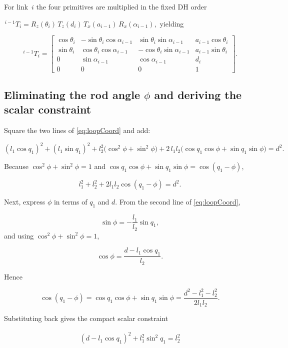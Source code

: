 \documentclass[12pt,a4paper]{article}
\begin{document}
For link~$i$ the four primitives are multiplied in the fixed DH order 
 
\(
{}^{\,i-1}\!T_i = R_{z}(\theta_i)\,T_{z}(d_i)\,T_{x}(a_{i-1})\,R_{x}(\alpha_{i-1}),
\)
yielding

\[
{}^{\,i-1}\!T_i =
\begin{bmatrix}
\cos\theta_i & -\sin\theta_i\cos\alpha_{i-1} &  \sin\theta_i\sin\alpha_{i-1} & a_{i-1}\cos\theta_i\\
\sin\theta_i &  \cos\theta_i\cos\alpha_{i-1} & -\cos\theta_i\sin\alpha_{i-1} & a_{i-1}\sin\theta_i\\
0            &  \sin\alpha_{i-1}             &  \cos\alpha_{i-1}             & d_i\\
0&0&0&1
\end{bmatrix}.\]

\subsection{Eliminating the rod angle \(\phi\) and deriving the scalar constraint}\label{app:rod_angle}

Square the two lines of \eqref{eq:loopCoord} and add:

\[
(l_{1}\cos q_{1})^{2} + (l_{1}\sin q_{1})^{2}
  + l_{2}^{2}\!\bigl(\cos^{2}\phi + \sin^{2}\phi\bigr)
  + 2\,l_{1}l_{2}\bigl(\cos q_{1}\cos\phi + \sin q_{1}\sin\phi\bigr)
  = d^{2}.
\]

Because \(\cos^{2}\phi+\sin^{2}\phi = 1\) and  
\(\cos q_{1}\cos\phi + \sin q_{1}\sin\phi = \cos(q_{1}-\phi)\),

\[
l_{1}^{2} + l_{2}^{2} + 2l_{1}l_{2}\cos(q_{1}-\phi) = d^{2}.
\]

Next, express \(\phi\) in terms of \(q_{1}\) and \(d\).
From the second line of \eqref{eq:loopCoord},

\[
\sin\phi = -\frac{l_{1}}{l_{2}}\sin q_{1},
\]
and using \(\cos^{2}\phi+\sin^{2}\phi=1\),

\[
\cos\phi = \frac{d - l_{1}\cos q_{1}}{l_{2}}.
\]

Hence

\[
\cos(q_{1}-\phi)
        = \cos q_{1}\cos\phi + \sin q_{1}\sin\phi
        = \frac{d^{2} - l_{1}^{2} - l_{2}^{2}}{2l_{1}l_{2}}.
\]

Substituting back gives the compact scalar constraint

\begin{align}\label{2}
(d - l_{1}\cos q_{1})^{2} + l_{1}^{2}\sin^{2}q_{1} = l_{2}^{2}
\end{align}
\end{document}
